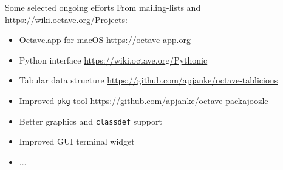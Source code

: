 \begin{frame}{Some selected ongoing efforts}
From mailing-lists
and {\color{DarkBlue}\url{https://wiki.octave.org/Projects}}:\\[1em]
\begin{itemize}
\itemsep1em
\item
Octave.app for macOS
\hfill{\scriptsize\color{DarkBlue} \url{https://octave-app.org}}
\item
Python interface
\hfill{\scriptsize\color{DarkBlue} \url{https://wiki.octave.org/Pythonic}}
\item
Tabular data structure
\hfill{\scriptsize\color{DarkBlue}
\url{https://github.com/apjanke/octave-tablicious}}
\item
Improved \texttt{pkg} tool
\hfill{\scriptsize\color{DarkBlue}
\url{https://github.com/apjanke/octave-packajoozle}}
\item
Better graphics and \texttt{classdef} support
\item
Improved GUI terminal widget
\item
...
\end{itemize}
\end{frame}